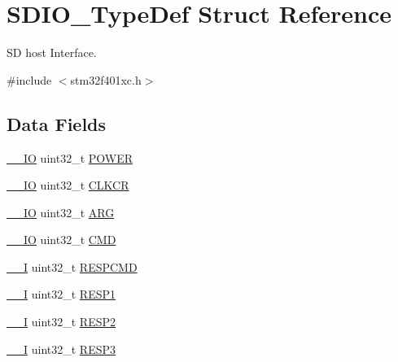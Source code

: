 \hypertarget{struct_s_d_i_o___type_def}{}\section{S\+D\+I\+O\+\_\+\+Type\+Def Struct Reference}
\label{struct_s_d_i_o___type_def}


SD host Interface.  




{\ttfamily \#include $<$stm32f401xc.\+h$>$}

\subsection*{Data Fields}
\begin{DoxyCompactItemize}
\item 
\hyperlink{core__sc300_8h_aec43007d9998a0a0e01faede4133d6be}{\+\_\+\+\_\+\+IO} uint32\+\_\+t \hyperlink{struct_s_d_i_o___type_def_a65bff76f3af24c37708a1006d54720c7}{P\+O\+W\+ER}
\item 
\hyperlink{core__sc300_8h_aec43007d9998a0a0e01faede4133d6be}{\+\_\+\+\_\+\+IO} uint32\+\_\+t \hyperlink{struct_s_d_i_o___type_def_aa94197378e20fc739d269be49d9c5d40}{C\+L\+K\+CR}
\item 
\hyperlink{core__sc300_8h_aec43007d9998a0a0e01faede4133d6be}{\+\_\+\+\_\+\+IO} uint32\+\_\+t \hyperlink{struct_s_d_i_o___type_def_a07d4e63efcbde252c667e64a8d818aa9}{A\+RG}
\item 
\hyperlink{core__sc300_8h_aec43007d9998a0a0e01faede4133d6be}{\+\_\+\+\_\+\+IO} uint32\+\_\+t \hyperlink{struct_s_d_i_o___type_def_adcf812cbe5147d300507d59d4a55935d}{C\+MD}
\item 
\hyperlink{core__sc300_8h_af63697ed9952cc71e1225efe205f6cd3}{\+\_\+\+\_\+I} uint32\+\_\+t \hyperlink{struct_s_d_i_o___type_def_aad371db807e2db4a2edf05b3f2f4b6cd}{R\+E\+S\+P\+C\+MD}
\item 
\hyperlink{core__sc300_8h_af63697ed9952cc71e1225efe205f6cd3}{\+\_\+\+\_\+I} uint32\+\_\+t \hyperlink{struct_s_d_i_o___type_def_a7b0ee0dc541683266dfab6335abca891}{R\+E\+S\+P1}
\item 
\hyperlink{core__sc300_8h_af63697ed9952cc71e1225efe205f6cd3}{\+\_\+\+\_\+I} uint32\+\_\+t \hyperlink{struct_s_d_i_o___type_def_a4d99c78dffdb6e81e8f6b7abec263419}{R\+E\+S\+P2}
\item 
\hyperlink{core__sc300_8h_af63697ed9952cc71e1225efe205f6cd3}{\+\_\+\+\_\+I} uint32\+\_\+t \hyperlink{struct_s_d_i_o___type_def_a3da04fbdd44f48a1840e5e0a6295f3cf}{R\+E\+S\+P3}

\end{DoxyCompactItemize}
